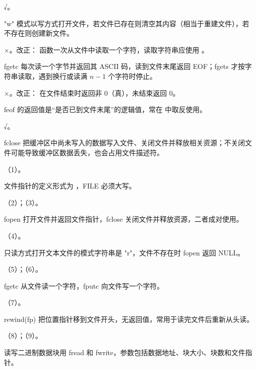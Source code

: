\documentclass[a4paper,11pt]{article}
\begin{document}
\q √。\begin{analysis}"w" 模式以写方式打开文件，若文件已存在则清空其内容（相当于重建文件），若不存在则创建新文件。\end{analysis}

\q ×。改正： 函数一次从文件中读取一个字符，读取字符串应使用 。\begin{analysis}fgetc 每次读一个字节并返回其 ASCII 码，读到文件末尾返回 EOF；fgets 才按字符串读取，遇到换行或读满 $n-1$ 个字符时停止。\end{analysis}

\q ×。改正： 在文件结束时返回非 0（真），未结束返回 0。\begin{analysis}feof 的返回值是“是否已到文件末尾”的逻辑值，常在  中取反使用。\end{analysis}

\q √。\begin{analysis}fclose 把缓冲区中尚未写入的数据写入文件、关闭文件并释放相关资源；不关闭文件可能导致缓冲区数据丢失，也会占用文件描述符。\end{analysis}


\q （1）。\begin{analysis}文件指针的定义形式为 ，FILE 必须大写。\end{analysis}

\q （2）；（3）。\begin{analysis}fopen 打开文件并返回文件指针，fclose 关闭文件并释放资源，二者成对使用。\end{analysis}

\q （4）。\begin{analysis}只读方式打开文本文件的模式字符串是 "r"，文件不存在时 fopen 返回 NULL。\end{analysis}

\q （5）；（6）。\begin{analysis}fgetc 从文件读一个字符，fputc 向文件写一个字符。\end{analysis}

\q （7）。\begin{analysis}rewind(fp) 把位置指针移到文件开头，无返回值，常用于读完文件后重新从头读。\end{analysis}

\q （8）；（9）。\begin{analysis}读写二进制数据块用 fread 和 fwrite，参数包括数据地址、块大小、块数和文件指针。\end{analysis}
\end{document}
